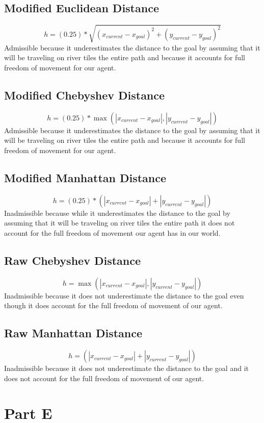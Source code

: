 \documentclass[12pt]{article}
\begin{document}
\subsection{Modified Euclidean Distance}
 \[ h = (0.25) * \sqrt{ (x_{current} - x_{goal})^2 + (y_{current} - y_{goal})^2}\]
\newline
 Admissible because it underestimates the distance to the goal by assuming that it will be traveling on river tiles the entire path and because it accounts for full freedom of movement for our agent.
\subsection{Modified Chebyshev Distance}
  \[ h = (0.25) * \max( | x_{current} - x_{goal} |, | y_{current} - y_{goal} | )\]
\newline
Admissible because it underestimates the distance to the goal by assuming that it will be traveling on river tiles the entire path and because it accounts for full freedom of movement for our agent.
\subsection{Modified Manhattan Distance}
\[ h = (0.25) * ( | x_{current} - x_{goal} | + | y_{current} - y_{goal} | )\]
\newline
Inadmissible because while it underestimates the distance to the goal by assuming that it will be traveling on river tiles the entire path it does not account for the full freedom of movement our agent has in our world.
\subsection{Raw Chebyshev Distance}
 \[ h = \max( | x_{current} - x_{goal} |, | y_{current} - y_{goal} | )\]
\newline
Inadmissible because it does not underestimate the distance to the goal even though it does account for the full freedom of movement of our agent.
\subsection{Raw Manhattan Distance}
\[ h =  ( | x_{current} - x_{goal} | + | y_{current} - y_{goal} | )\] 
Inadmissible because it does not underestimate the distance to the goal and it does not account for the full freedom of movement of our agent.

\section{Part E}
\end{document}
